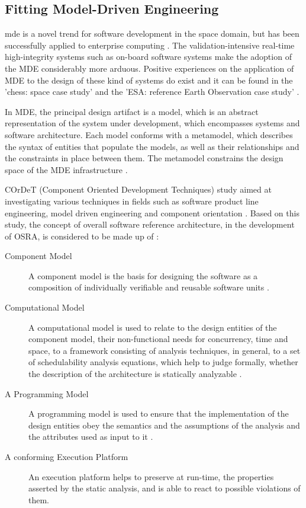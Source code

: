 \subsection{Fitting Model-Driven Engineering}
\ac{mde} is a novel trend for software development in the space domain, but has been successfully applied to enterprise computing \cite{CompBasedDev}. The validation-intensive real-time high-integrity systems such as on-board software systems make the adoption of the MDE considerably more arduous. Positive experiences on the application of MDE to the design of these kind of systems do exist and it can be found in the '\ac{chess}: space case study' \cite{CompBasedProcess} and the 'ESA: reference Earth Observation case study' \cite{CompBasedProcess}.

In MDE, the principal design artifact is a model, which is an abstract representation of the system under development, which encompasses systems and software architecture. Each model conforms with a metamodel, which describes the syntax of entities that populate the models, as well as their relationships and the constraints in place between them. The metamodel constrains the design space of the MDE infrastructure \cite{Metamodelling}.  

COrDeT (Component Oriented Development Techniques) study aimed at investigating various techniques in fields such as software product line engineering, model driven engineering and component orientation \cite{CORDET}. Based on this study, the concept of overall software reference architecture, in the development of OSRA, is considered to be made up of \cite{SoftRefArch}\cite{SAVOIR}:

\begin{description}
\item [Component Model] A component model is the basis for designing the software as a composition of individually verifiable and reusable software units \cite{ComponentModel}.

\item [Computational Model] A computational model is used to relate to the design entities of the component model, their non-functional needs for concurrency, time and space, to a framework consisting of analysis techniques, in general, to a set of schedulability analysis equations, which help to judge formally, whether the description of the architecture is statically analyzable \cite{ScheduAnaly}.

\item [A Programming Model] A programming model is used to ensure that the implementation of the design entities obey the semantics and the assumptions of the analysis and the attributes used as input to it \cite{CharEvoRAVCodeAr}.

\item [A conforming Execution Platform] An execution platform helps to preserve at run-time, the properties asserted by the static analysis, and is able to react to possible violations of them.  
\end{description}

